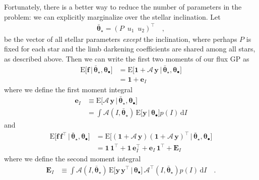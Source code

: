 \documentclass[modern]{aastex62}
\begin{document}
Fortunately, there is a better way to reduce the number of parameters in
the problem: we can explicitly marginalize over the stellar inclination.
Let
%
\begin{align}
    \label{eq:thetastarbar}
    \bar{\pmb{\theta}}_\star = \left(
    P \,\,\,
    u_1 \,\,\,
    u_2
    \right)^\top
    \quad,
\end{align}
%
be the vector of all stellar parameters \emph{except}
the inclination, where perhaps $P$ is fixed for each star and the limb darkening coefficients
are shared among all stars, as described above.
Then we can write the first two moments of our flux GP as
%
\begin{align}
    \label{eq:einc}
    \mathrm{E} \Big[ \mathbf{f} \, \Big| \, \bar{\pmb{\theta}}_\star, \pmb{\theta}_\bullet \Big]
     & =
    \mathrm{E} \Big[ \mathbf{1} + \pmb{\mathcal{A}} \, \mathbf{y} \, \Big| \, \bar{\pmb{\theta}}_\star, \pmb{\theta}_\bullet \Big]
    \nonumber \\[0.5em]
     & =
    \mathbf{1} + \mathbf{e}_I
\end{align}
%
where we define the first moment integral
%
\begin{align}
    \label{eq:eI}
    \mathbf{e}_I
     & \equiv
    \mathrm{E} \Big[ \pmb{\mathcal{A}} \, \mathbf{y} \, \Big| \, \bar{\pmb{\theta}}_\star, \pmb{\theta}_\bullet \Big]
    \nonumber \\[0.5em]
     & =
    \int
    \pmb{\mathcal{A}}(I, \bar{\pmb{\theta}}_\star) \,
    \mathrm{E} \Big[ \mathbf{y} \, \Big| \, \pmb{\theta}_\bullet \Big]
    p(I) \, \mathrm{d}I
\end{align}
%
and
%
\begin{align}
    \label{eq:Einc}
    \mathrm{E} \Big[ \mathbf{f} \, \mathbf{f}^\top \, \Big| \, \bar{\pmb{\theta}}_\star, \pmb{\theta}_\bullet \Big]
     & =
    \mathrm{E} \Big[ \left(\mathbf{1} + \pmb{\mathcal{A}} \, \mathbf{y}\right) \left(\mathbf{1} + \pmb{\mathcal{A}} \, \mathbf{y}\right)^\top  \, \Big| \, \bar{\pmb{\theta}}_\star, \pmb{\theta}_\bullet \Big]
    \nonumber \\[0.5em]
     & =
    \mathbf{1} \, \mathbf{1}^\top +
    \mathbf{1} \, \mathbf{e}_I^\top +
    \mathbf{e}_I \, \mathbf{1}^\top +
    \mathbf{E}_I
\end{align}
%
where we define the second moment integral
%
\begin{align}
    \label{eq:EI}
    \mathbf{E}_I
     & \equiv
    \int
    \pmb{\mathcal{A}}(I, \bar{\pmb{\theta}}_\star) \,
    \mathrm{E} \Big[ \mathbf{y} \, \mathbf{y}^\top \, \Big| \, \pmb{\theta}_\bullet \Big] \,
    \pmb{\mathcal{A}}^\top(I, \bar{\pmb{\theta}}_\star)
    p(I) \, \mathrm{d}I
    \quad.
\end{align}
\end{document}
